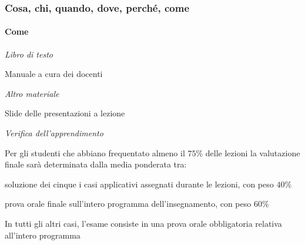 \begin{frame}%
%

\frametitle{Cosa, chi, quando, dove, perch\'{e}, come}%
%

\framesubtitle{Come}%
%

%


\begin{stepitemize}
\item \textit{Libro di testo}

\begin{stepitemize}
\item Manuale a cura dei docenti
\end{stepitemize}

\item \textit{Altro materiale}

\begin{stepitemize}
\item Slide delle presentazioni a lezione
\end{stepitemize}

\item \textit{Verifica dell'apprendimento}

\begin{stepitemize}
\item Per gli studenti che abbiano frequentato almeno il $75\%$ delle lezioni
la valutazione finale sar\`{a} determinata dalla media ponderata tra:

\begin{stepitemize}
\item soluzione dei cinque i casi applicativi assegnati durante le lezioni,
con peso $40\%$

\item prova orale finale sull'intero programma dell'insegnamento, con peso
$60\%$
\end{stepitemize}

\item In tutti gli altri casi, l'esame consiste in una prova orale
obbligatoria relativa all'intero programma
\end{stepitemize}
\end{stepitemize}

%

\transboxout
\end{frame}%




